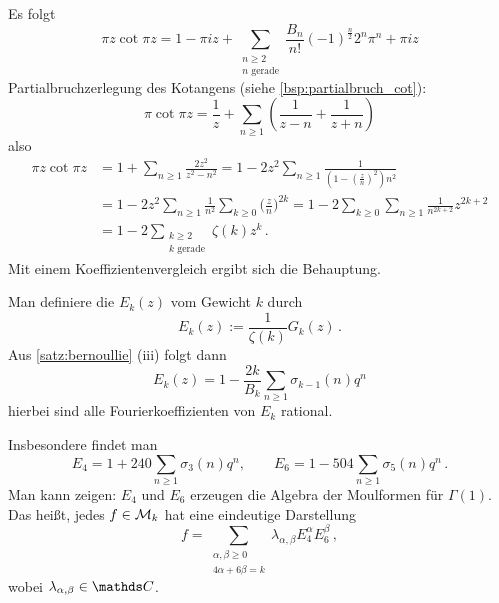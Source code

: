 \begin{bewe-list}
	Es folgt
	\[
	\pi z \cot \pi z = 1 - \pi iz + \sum_{\substack{n\geq 2\\ \scriptscriptstyle n \text{ gerade}}} \frac{B_n}{n!} (-1)^{\frac{n}{2}} 2^n \pi^n + \pi iz
	\]
	Partialbruchzerlegung des Kotangens (siehe \autoref{bsp:partialbruch_cot}):
	\[
	\pi \cot \pi z = \frac{1}{z} + \sum_{n\geq1} \left(\frac{1}{z-n} + \frac{1}{z+n}\right)
	\]
	also
	\begin{align*}
	\pi z \cot \pi z
	&= 1 + \sum_{n\geq1} \frac{2z^2}{z^2-n^2}
	= 1 - 2z^2\sum_{n\geq1} \frac{1}{(1-(\frac{z}{n})^2)n^2} \\ %
	&= 1 - 2z^2 \sum_{n\geq1} \frac{1}{n^2} \sum_{k \geq 0} \Big(\frac{z}{n}\Big)^{2k}
	= 1 - 2 \sum_{k \geq 0} \sum_{n \geq 1} \frac{1}{n^{2k+2}} z^{2k+2} \\
	&= 1 - 2\sum_{\substack{k\geq2\\ \scriptscriptstyle k \text{ gerade}}} \zeta(k)z^k
	\,.
	\end{align*}
	Mit einem Koeffizientenvergleich ergibt sich die Behauptung.
\end{bewe-list}

\begin{defi}
	Man definiere die  $E_k(z)$ vom Gewicht $k$ durch
	\[
	E_k(z) := \frac{1}{\zeta(k)} G_k(z)
	\,.
	\]
	Aus \autoref{satz:bernoullie} (iii) folgt dann
	\[
	E_k(z) = 1 - \frac{2k}{B_k} \sum_{n\geq1} \sigma_{k-1}(n) q^n
	\]
	hierbei sind alle Fourierkoeffizienten von $E_k$ rational.
\end{defi}

Insbesondere findet man
\[
E_4 = 1 + 240 \sum_{n\geq 1} \sigma_3(n)q^n, \qquad
E_6 = 1 - 504 \sum_{n \geq 1} \sigma_5(n)q^n
\,.
\]
Man kann zeigen: $E_4$ und $E_6$ erzeugen die Algebra der Moulformen für $\Gamma(1)$.
Das heißt, jedes $f \in \mathcal{M}_k$ hat eine eindeutige Darstellung
\[
f = \sum_{\substack{\alpha, \beta \geq 0\\ \scriptscriptstyle 4\alpha + 6\beta = k}} \lambda_{\alpha, \beta} E_4^\alpha E_6^\beta
\,,
\]
wobei $\lambda_{\alpha, \beta} \in \CC$.